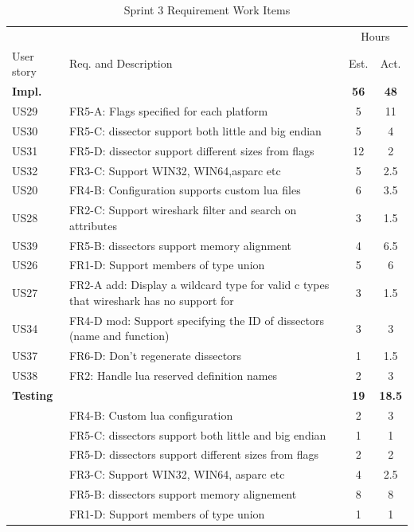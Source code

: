 \begin{table}[!htb] \small \center
\caption{Sprint 3 Requirement Work Items \label{tab:sprint3req}}
\begin{tabularx}{\textwidth}{l X c c}
	\toprule
	& & \multicolumn{2}{c}{Hours} \\
	\cmidrule(r){3-4}
	User story & Req. and Description & Est. & Act. \\
	\midrule
	\textbf{Impl.} &  & \textbf{56} & \textbf{48} \\
	US29 & FR5-A: Flags specified for each platform &  5  & 11 \\
	US30 & FR5-C: \Gls{dissector} support both little and big \gls{endian} & 5  & 4 \\
	US31 & FR5-D: \Gls{dissector} support different sizes from flags & 12  & 2 \\
	US32 & FR3-C: Support WIN32, WIN64,\gls{asparc} etc &  5  & 2.5 \\
	US20 & FR4-B: Configuration supports custom \Gls{lua} files & 6 & 3.5\\
	US28 & FR2-C: Support \Gls{wireshark} filter and search on attributes &  3 & 1.5\\
	US39 & FR5-B: \Glspl{dissector} support memory alignment & 4 & 6.5\\
	US26 & FR1-D: Support \glspl{member} of type \gls{union} & 5  & 6\\
	US27 & FR2-A add: Display a \gls{wildcard} type for valid \Gls{c} types that \Gls{wireshark} has no support for & 3  & 1.5\\
	US34 & FR4-D mod: Support specifying the ID of \glspl{dissector} (name and function) & 3  & 3 \\
	US37 & FR6-D: Don’t regenerate \glspl{dissector} & 1 & 1.5\\
	US38 & FR2: Handle \Gls{lua} reserved definition names & 2 & 3 \\
	\addlinespace
	\textbf{Testing} &  & \textbf{19} & \textbf{18.5} \\
	 & FR4-B: Custom \Gls{lua} configuration & 2 & 3\\
	 & FR5-C: \Glspl{dissector} support both little and big \gls{endian} & 1 & 1 \\
	 & FR5-D: \Glspl{dissector} support different sizes from flags & 2 & 2 \\
	 & FR3-C: Support WIN32, WIN64, \gls{asparc} etc & 4 & 2.5 \\
	 & FR5-B: \Glspl{dissector} support memory alignement & 8 & 8 \\
	 & FR1-D: Support members of type \gls{union} & 1 & 1 \\

\end{tabularx}
\end{table}
